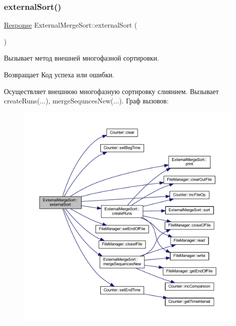 \subsubsection{\texorpdfstring{external\+Sort()}{externalSort()}}
{\footnotesize\ttfamily \hyperlink{_structures_8h_ab3500e5d3c915d1b5cc58dcab8673fd4}{Response} External\+Merge\+Sort\+::external\+Sort (\begin{DoxyParamCaption}{ }\end{DoxyParamCaption})}



Вызывает метод внешней многофазной сортировки. 

\begin{DoxyReturn}{Возвращает}
Код успеха или ошибки.
\end{DoxyReturn}
Осуществляет внешнюю многофазную сортировку слиянием. Вызывает create\+Runs(...), merge\+Sequnces\+New(...). Граф вызовов\+:\nopagebreak
\begin{figure}[H]
\begin{center}
\leavevmode
\includegraphics[width=350pt]{class_external_merge_sort_a0f17e02ed3c66bc241123cc1ee01aded_cgraph}
\end{center}
\end{figure}
\hypertarget{class_external_merge_sort_ad19b6bded122acbb6a4ee97b591011f8}{}\label{class_external_merge_sort_ad19b6bded122acbb6a4ee97b591011f8} 
